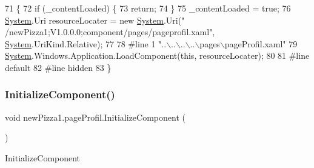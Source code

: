\begin{DoxyCode}
71                                           \{
72             \textcolor{keywordflow}{if} (\_contentLoaded) \{
73                 \textcolor{keywordflow}{return};
74             \}
75             \_contentLoaded = \textcolor{keyword}{true};
76             \hyperlink{namespaceSystem}{System}.Uri resourceLocater = \textcolor{keyword}{new} \hyperlink{namespaceSystem}{System}.Uri(\textcolor{stringliteral}{"
      /newPizza1;V1.0.0.0;component/pages/pageprofil.xaml"}, \hyperlink{namespaceSystem}{System}.UriKind.Relative);
77             
78 \textcolor{preprocessor}{            #line 1 "..\(\backslash\)..\(\backslash\)..\(\backslash\)..\(\backslash\)pages\(\backslash\)pageProfil.xaml"
}
79             \hyperlink{namespaceSystem}{System}.Windows.Application.LoadComponent(\textcolor{keyword}{this}, resourceLocater);
80             
81 \textcolor{preprocessor}{            #line default
}
82 \textcolor{preprocessor}{            #line hidden
}
83         \}
\end{DoxyCode}
\mbox{\label{classnewPizza1_1_1pageProfil_a53ca6e755a62dfda0434ae88b7355d3e}} 
\subsubsection{\texorpdfstring{Initialize\+Component()}{InitializeComponent()}\hspace{0.1cm}{\footnotesize\ttfamily [3/3]}}
{\footnotesize\ttfamily void new\+Pizza1.\+page\+Profil.\+Initialize\+Component (\begin{DoxyParamCaption}{ }\end{DoxyParamCaption})\hspace{0.3cm}{\ttfamily [inline]}}



Initialize\+Component 


